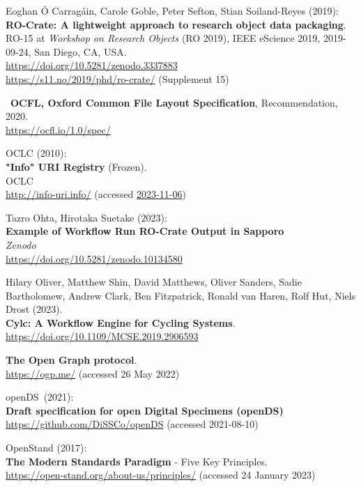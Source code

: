 \begin{thebibliography}{9}
Eoghan Ó Carragáin, Carole Goble, Peter Sefton, Stian Soiland-Reyes (2019):\\
\textbf{RO-Crate: A lightweight approach to research object data packaging}.\\
RO-15 at \emph{Workshop on Research Objects} (RO 2019), IEEE eScience 2019, 2019-09-24, San Diego, CA, USA.\\
\url{https://doi.org/10.5281/zenodo.3337883}\\
\url{https://s11.no/2019/phd/ro-crate/}
(Supplement 15)

~\textbf{OCFL, Oxford Common File Layout Specification},
Recommendation, 2020.\\
\url{https://ocfl.io/1.0/spec/}

OCLC (2010): \\
\textbf{"Info" {URI Registry}} ({Frozen}). \\
OCLC\\
\url{http://info-uri.info/} 
(accessed \href{https://web.archive.org/web/20231106015204/https://oclc-research.github.io/infoURI-Frozen/}{2023-11-06})

Tazro Ohta, Hirotaka Suetake (2023):\\
\textbf{Example of Workflow Run RO-Crate Output in Sapporo}\\
\emph{Zenodo}\\
\url{https://doi.org/10.5281/zenodo.10134580}

Hilary Oliver, Matthew Shin, David Matthews, Oliver Sanders, Sadie Bartholomew, Andrew Clark, Ben Fitzpatrick, Ronald van Haren, Rolf Hut, Niels Drost
(2023).\\
\textbf{Cylc: A Workflow Engine for Cycling Systems}.\\
\url{https://doi.org/10.1109/MCSE.2019.2906593}

\textbf{The {Open Graph} protocol}.  \\
\url{https://ogp.me/}
(accessed 26 May 2022)

openDS~(2021):\\
\textbf{Draft specification for open Digital Specimens (openDS)}\\
\url{https://github.com/DiSSCo/openDS} (accessed 2021-08-10)

OpenStand (2017): \\
\textbf{The {Modern Standards Paradigm}} - {Five Key Principles}.\\
\url{https://open-stand.org/about-us/principles/} (accessed 24 January
2023)


\end{thebibliography}
